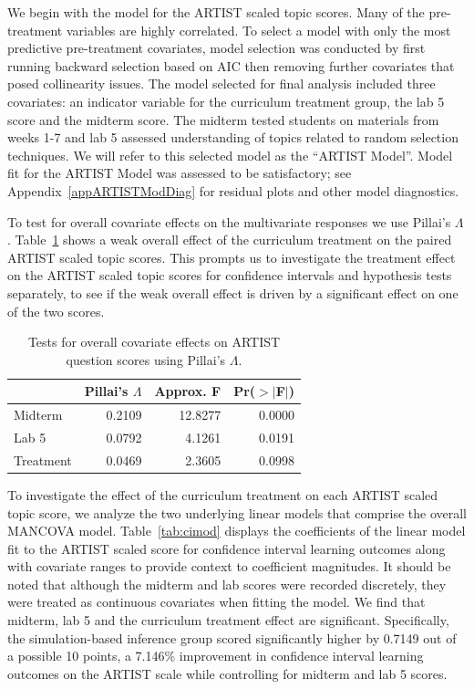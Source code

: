 \documentclass[11pt]{isuthesis}\usepackage[]{graphicx}\usepackage[]{color}
\begin{document}
We begin with the model for the ARTIST scaled topic scores.  Many of the pre-treatment variables are highly correlated. To select a model with only the most predictive pre-treatment covariates, model selection was conducted by first running backward selection based on AIC then removing further covariates that posed collinearity issues. The model selected for final analysis included three covariates: an indicator variable for the curriculum treatment group, the lab 5 score and the midterm score.  The midterm tested students on materials from weeks 1-7 and lab 5 assessed understanding of topics related to random selection techniques.  We will refer to this selected model as the ``ARTIST Model''. Model fit for the ARTIST Model was assessed to be satisfactory; see Appendix~\ref{appARTISTModDiag} for residual plots and other model diagnostics.





To test for overall covariate effects on the multivariate responses we use Pillai's $\Lambda$. Table~\ref{tab:overallmod} shows a weak overall effect of the curriculum treatment on the paired ARTIST scaled topic scores.  This prompts us to investigate the treatment effect on the ARTIST scaled topic scores for confidence intervals and hypothesis tests separately, to see if the weak overall effect is driven by a significant effect on one of the two scores.

\begin{table}[hbtp]
\centering
\begin{tabular}{lrrr} \hline
 & Pillai's $\Lambda$ & Approx. F & Pr($>$$|$F$|$)\\ 
 \hline  
Midterm & 0.2109 & 12.8277 &
0.0000\\ 
Lab 5 & 0.0792 & 4.1261 &
0.0191\\ 
Treatment & 0.0469 & 2.3605 &
0.0998\\ 
\hline
\end{tabular}
\caption{Tests for overall covariate effects on ARTIST question scores using Pillai's $\Lambda$.}
\label{tab:overallmod}
\end{table}

To investigate the effect of the curriculum treatment on each ARTIST scaled topic score, we analyze the two underlying linear models that comprise the overall MANCOVA model. Table~\ref{tab:cimod} displays the coefficients of the linear model fit to the ARTIST scaled score for confidence interval learning outcomes along with covariate ranges to provide context to coefficient magnitudes. It should be noted that although the midterm and lab scores were recorded discretely, they were treated as continuous covariates when fitting the model. We find that midterm, lab 5 and the curriculum treatment effect are significant. Specifically, the simulation-based inference group scored significantly higher by 0.7149 out of a possible 10 points, a 7.146\% improvement in confidence interval learning outcomes on the ARTIST scale while controlling for midterm and lab 5 scores.\\
\end{document}
